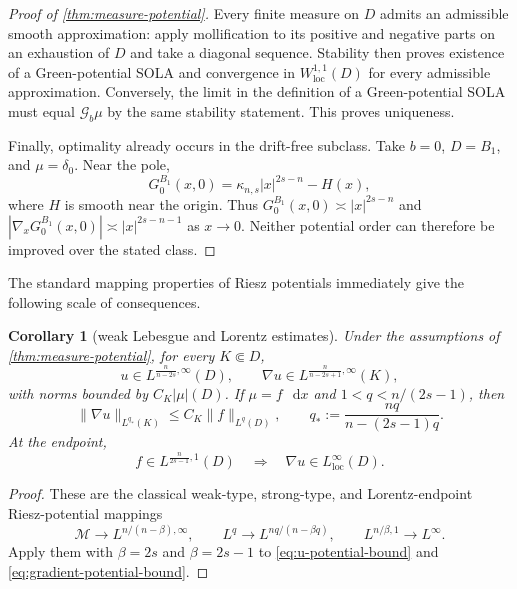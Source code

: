 \documentclass[10pt,a4paper]{amsart}
\numberwithin{equation}{section}
\newtheorem{corollary}[theorem]{Corollary}
\newcommand{\M}{\mathcal M}
\newcommand{\differential}{\mathop{}\!\mathrm d}
\begin{document}
\begin{proof}[Proof of \cref{thm:measure-potential}]
Every finite measure on $D$ admits an admissible smooth approximation:
apply mollification to its positive and negative parts on an exhaustion of
$D$ and take a diagonal sequence.  Stability then proves existence of a
Green-potential SOLA and convergence in
$W^{1,1}_{\mathrm{loc}}(D)$ for every admissible approximation.  Conversely,
the limit in the definition of a Green-potential SOLA must equal
$\mathcal G_b\mu$ by the same stability statement.  This proves uniqueness.

Finally, optimality already occurs in the drift-free subclass.  Take
$b=0$, $D=B_1$, and $\mu=\delta_0$.  Near the pole,
\[
 G_0^{B_1}(x,0)=\kappa_{n,s}|x|^{2s-n}-H(x),
\]
where $H$ is smooth near the origin.  Thus
$G_0^{B_1}(x,0)\asymp|x|^{2s-n}$ and
$|\nabla_xG_0^{B_1}(x,0)|\asymp|x|^{2s-n-1}$ as $x\to0$.
Neither potential order can therefore be improved over the stated class.
\endgroup
\end{proof}


The standard mapping properties of Riesz potentials immediately give the
following scale of consequences.

\begin{corollary}[weak Lebesgue and Lorentz estimates]
\label{cor:measure-mapping}
Under the assumptions of \cref{thm:measure-potential}, for every
$K\Subset D$,
\begin{equation}\label{eq:weak-estimates}
 u\in L^{\frac n{n-2s},\infty}(D),\qquad
 \nabla u\in L^{\frac n{n-2s+1},\infty}(K),
\end{equation}
with norms bounded by $C_K|\mu|(D)$.  If $\mu=f\,\differential x$ and
$1<q<n/(2s-1)$, then
\begin{equation}\label{eq:strong-gradient-mapping}
 \|\nabla u\|_{L^{q_*}(K)}\le C_K\|f\|_{L^q(D)},
 \qquad q_*:=\frac{nq}{n-(2s-1)q}.
\end{equation}
At the endpoint,
\begin{equation}\label{eq:lorentz-endpoint}
 f\in L^{\frac n{2s-1},1}(D)
 \quad\Longrightarrow\quad
 \nabla u\in L^\infty_{\mathrm{loc}}(D).
\end{equation}
\end{corollary}

\begin{proof}
These are the classical weak-type, strong-type, and Lorentz-endpoint
Riesz-potential mappings
\[
 \M\longrightarrow L^{n/(n-\beta),\infty},\qquad
 L^q\longrightarrow L^{nq/(n-\beta q)},\qquad
 L^{n/\beta,1}\longrightarrow L^\infty.
\]
Apply them with $\beta=2s$ and
$\beta=2s-1$ to \eqref{eq:u-potential-bound} and
\eqref{eq:gradient-potential-bound}.
\end{proof}
\end{document}
